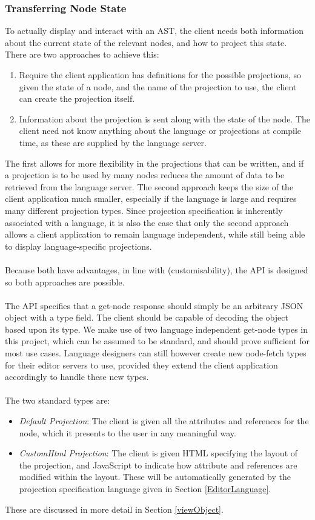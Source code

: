 \documentclass{article}
\begin{document}
{\subsubsection{Transferring Node State}\label{apiNodeStateTransfer}
To actually display and interact with an AST, the client needs both information about the current state of the relevant nodes, and how to project this state. There are two approaches to achieve this:
\begin{enumerate}
\item Require the client application has definitions for the possible projections, so given the state of a node, and the name of the projection to use, the client can create the projection itself.
\item Information about the projection is sent along with the state of the node. The client need not know anything about the language or projections at compile time, as these are supplied by the language server.
\end{enumerate}
The first allows for more flexibility in the projections that can be written, and if a projection is to be used by many nodes reduces the amount of data to be retrieved from the language server. The second approach keeps the size of the client application much smaller, especially if the language is large and requires many different projection types. Since projection specification is inherently associated with a language, it is also the case that only the second approach allows a client application to remain language independent, while still being able to display language-specific projections.
\\
\\
Because both have advantages, in line with \RCustom (customisability), the API is designed so both approaches are possible.
\\
\\
The API specifies that a get-node response should simply be an arbitrary JSON~\cite{json} object with a type field. The client should be capable of decoding the object based upon its type. We make use of two language independent get-node types in this project, which can be assumed to be standard, and should prove sufficient for most use cases. Language designers can still however create new node-fetch types for their editor servers to use, provided they extend the client application accordingly to handle these new types. 
\\
\\
The two standard types are:
\begin{itemize}
\item \emph{Default Projection}: The client is given all the attributes and references for the node, which it presents to the user in any meaningful way.
\item \emph{CustomHtml Projection}: The client is given HTML specifying the layout of the projection, and JavaScript to indicate how attribute and references are modified within the layout. These will be automatically generated by the projection specification language given in Section \ref{EditorLanguage}.
\end{itemize}
These are discussed in more detail in Section \ref{viewObject}.
}
\end{document}
